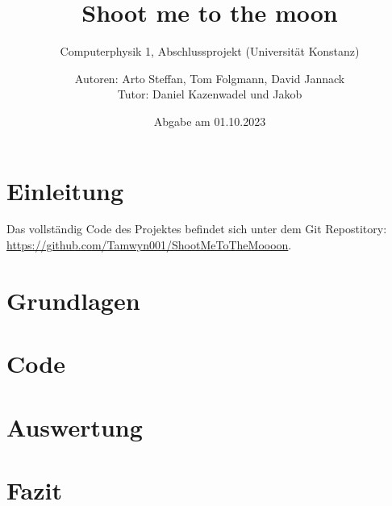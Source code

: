 \documentclass[
    oneside, 
    footinclude=off, 
    captions=tableheading, 
    DIV=12;usenames,
    dvipsnames
]{scrartcl}
\begin{document}
    \title{Shoot me to the moon}
    \subtitle{Computerphysik 1, Abschlussprojekt (Universität Konstanz)}
    \author{Autoren: Arto Steffan, Tom Folgmann, David Jannack \\ \large{Tutor: Daniel Kazenwadel und Jakob }}
    \date{Abgabe am 01.10.2023}
    \maketitle
    \thispagestyle{empty}
    \section*{Einleitung}
        

    \newpage


    \tableofcontents
    \thispagestyle{empty}	
    \newpage
    \setcounter{page}{1}
Das vollständig Code des Projektes befindet sich unter dem Git Repostitory: \url{https://github.com/Tamwyn001/ShootMeToTheMoooon}.


\newpage
\section{Grundlagen}
    
	

\newpage
\section{Code}
    

\newpage
\section{Auswertung}
    

\newpage
\section{Fazit}
    


\newpage
    
\newpage
    \listoffigures
    \listoftables


%
\end{document}
